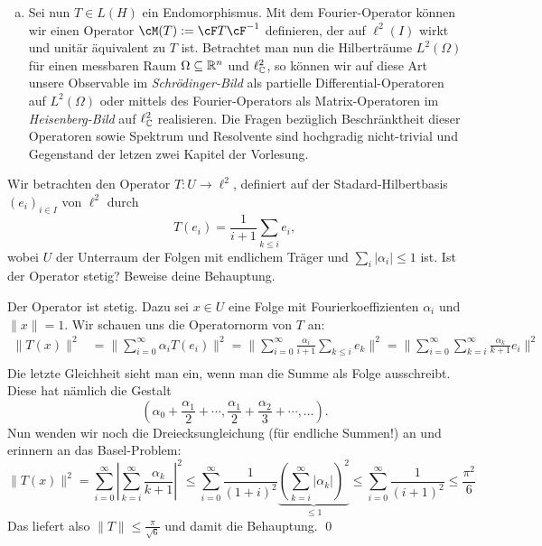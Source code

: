 \begin{bemerkung}
\begin{enumerate}[(a)]
\item Sei nun $T \in L(H)$ ein Endomorphismus. Mit dem Fourier-Operator können wir einen Operator $\cM(T):=\cF T \cF^{-1}$ definieren, der auf $\ell^2(I)$ wirkt und unitär äquivalent zu $T$ ist. Betrachtet man nun die Hilberträume $L^2(\Omega)$ für einen messbaren Raum $\Omega \subseteq \mathbb{R}^n$ und $\ell^2_{\mathbb{C}}$, so können wir auf diese Art unsere Observable im \textit{Schrödinger-Bild} als partielle Differential-Operatoren auf $L^2(\Omega)$ oder mittels des Fourier-Operators als Matrix-Operatoren im \textit{Heisenberg-Bild} auf $\ell^2_{\mathbb{C}}$ realisieren. Die Fragen bezüglich Beschränktheit dieser Operatoren sowie Spektrum und Resolvente sind hochgradig nicht-trivial und Gegenstand der letzen zwei Kapitel der Vorlesung.
    \end{enumerate}
\end{bemerkung}

\begin{übung}
    Wir betrachten den Operator $T: U \to \ell^2$, definiert auf der Stadard-Hilbertbasis $(e_i)_{i \in I}$ von $\ell^2$ durch $$T(e_i)=\frac{1}{i+1}\sum_{k \leq i} e_i,$$ wobei $U$ der Unterraum der Folgen mit endlichem Träger und $\sum_i |\alpha_i| \leq 1$ ist. Ist der Operator stetig? Beweise deine Behauptung. 
\end{übung}

\begin{lösung}
    Der Operator ist stetig. Dazu sei $x \in U$ eine Folge mit Fourierkoeffizienten $\alpha_i$ und $\|x\|=1$. Wir schauen uns die Operatornorm von $T$ an:
    \begin{align*}
    \|T(x)\|^2 &= \| \sum_{i=0}^\infty \alpha_i T(e_i) \|^2 = \| \sum_{i=0}^\infty \frac{\alpha_i}{i+1} \sum_{k \leq i} e_k \|^2 = \| \sum_{i=0}^\infty \sum_{k=i}^\infty \frac{\alpha_k}{k+1} e_i \|^2 \\
    \end{align*}
    Die letzte Gleichheit sieht man ein, wenn man die Summe als Folge ausschreibt. Diese hat nämlich die Gestalt
    \begin{equation}
        \left( \alpha_0 + \frac{\alpha_1}{2} + \cdots, \frac{\alpha_1}{2} + \frac{\alpha_2}{3}+ \cdots, \dots \right).
    \end{equation}
Nun wenden wir noch die Dreiecksungleichung (für endliche Summen!) an und erinnern an das Basel-Problem:
\begin{equation}
    \|T(x)\|^2 = \sum_{i=0}^\infty \left| \sum_{k=i}^\infty \frac{\alpha_k}{k+1} \right|^2 \leq \sum_{i=0}^\infty \frac{1}{(1+i)^2} \underbrace{\left( \sum_{k=i}^\infty |\alpha_k|\right)^2}_{\leq 1} \leq \sum_{i=0}^\infty \frac{1}{(i+1)^2} \leq \frac{\pi^2}{6}
\end{equation}
Das liefert also $\|T\| \leq \frac{\pi}{\sqrt{6}}$ und damit die Behauptung.
\qed
\end{lösung}
